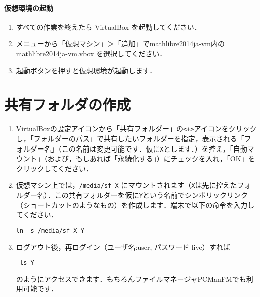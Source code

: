\documentclass[a4j]{ltjsarticle}
\newcommand{\vm}{mathlibre2014ja-vm}
\begin{document}

\paragraph{仮想環境の起動}
\begin{enumerate}
 \item すべての作業を終えたら VirtualBox を起動してください．
 \item メニューから「仮想マシン」＞「追加」で\vm 内の \vm.vbox を選択してください．
 \item 起動ボタンを押すと仮想環境が起動します．
\end{enumerate}

\section{共有フォルダの作成}
\begin{enumerate}
 \item VirtualBoxの設定アイコンから「共有フォルダー」の\verb|<+>|アイコンをクリックし，「フォルダーのパス」で共有したいフォルダーを指定，表示される「フォルダー名」（この名前は変更可能です．仮に\verb|X|とします．）を控え，「自動マウント」（および，もしあれば「永続化する」）にチェックを入れ，「OK」をクリックしてください．
 \item 仮想マシン上では，\verb|/media/sf_X| にマウントされます（\verb|X|は先に控えたフォルダー名）．この共有フォルダーを仮に\verb|Y|という名前でシンボリックリンク（ショートカットのようなもの）を作成します．端末で以下の命令を入力してください．
\begin{lstlisting}
ln -s /media/sf_X Y
\end{lstlisting}
\item ログアウト後，再ログイン（ユーザ名:user, パスワード live）すれば
\begin{lstlisting}
 ls Y
\end{lstlisting}
のようにアクセスできます．もちろんファイルマネージャPCManFMでも利用可能です．
\end{enumerate}

\end{document}
